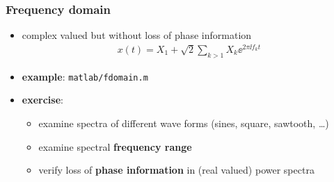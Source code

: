\begin{frame} %
	\frametitle{Frequency domain}
	\begin{itemize}
		\item complex valued but without loss of phase information
			\begin{align*}
				x(t)=X_1+\sqrt2\sum_{k>1}X_k\ee^{2\pi\ii f_kt}
			\end{align*}
		\item \textbf{example}: \texttt{matlab/fdomain.m}
			\begin{figure}
				\centering
				\begin{subfigure}[c]{0.48\linewidth}
				\end{subfigure}
				\hspace{0.01\linewidth}
				\begin{subfigure}[c]{0.48\linewidth}
				\end{subfigure}
			\end{figure}
		\item \textbf{exercise}:
			\begin{itemize}
				\item examine spectra of different wave forms (sines, square, sawtooth, \ldots)
				\item examine spectral \textbf{frequency range}
				\item verify loss of \textbf{phase information} in (real valued) power spectra
			\end{itemize}
	\end{itemize}
\end{frame}

